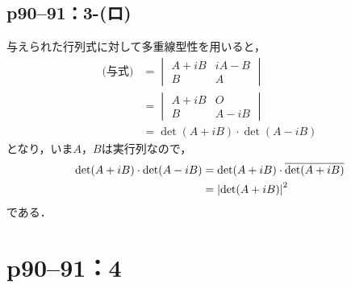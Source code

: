 \documentclass[a4paper,10pt,fleqn]{ltjsarticle}
\begin{document}
\subsection*{p90--91：3-(ロ)}
\begin{tleftbar}
    与えられた行列式に対して多重線型性を用いると，
    \begin{align*}
        \text{(与式)} & =
        \begin{vmatrix}
            A+iB & iA-B \\
            B    & A
        \end{vmatrix}
        \\
                    & = \begin{vmatrix}
                            A+iB & O    \\
                            B    & A-iB
                        \end{vmatrix}
        \\
                    & = \det (A+iB) \cdot \det(A-iB)
    \end{align*}
    となり，いま$A$，$B$は実行列なので，
    \begin{align*}
        \det (A+iB) \cdot \det(A-iB) & = \det (A+iB) \cdot \overline{\det (A+iB)} \\
                                     & = \abs{\det(A+iB)}^2
    \end{align*}
    である．
\end{tleftbar}

\newpage


\section*{p90--91：4}
\end{document}
